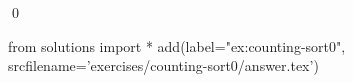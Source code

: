
\begin{ex} 
  \label{ex:counting-sort0}
  
  \qed
\end{ex} 
\begin{python0}
from solutions import *
add(label="ex:counting-sort0",
    srcfilename='exercises/counting-sort0/answer.tex') 
\end{python0}
